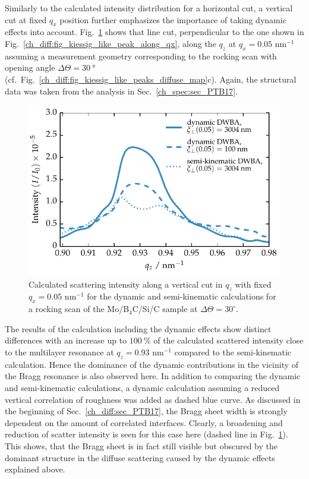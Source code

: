 Similarly to the calculated intensity distribution for a horizontal cut, a vertical cut at fixed $q_x$ position further emphasizes the importance of taking dynamic effects into account. Fig.~\ref{ch_diff:fig_comparison_full_semi} shows that line cut, perpendicular to the one shown in Fig.~\ref{ch_diff:fig_kiessig_like_peak_along_qx}, along the $q_z$ at $q_x=0.05$ nm$^{-1}$ assuming a measurement geometry corresponding to the rocking scan with opening angle $\Delta \Theta = \SI{30}{\degree}$ (cf.~Fig.~\ref{ch_diff:fig_kiessig_like_peaks_diffuse_map}c). Again, the structural data was taken from the analysis in Sec.~\ref{ch_spec:sec_PTB17}.
\begin{figure}[htbp]
        \includegraphics{img/PTB17_diffuse_qz_kinematic_vs_dynamic_100nm} \caption[Calculated diffuse scattering intensity along a vertical cut in $q_z$.]{Calculated scattering intensity along a vertical cut in $q_z$ with fixed $q_x=0.05$ nm$^{-1}$ for the dynamic and semi-kinematic calculations for a rocking scan of the Mo/B$_4$C/Si/C sample at $\Delta\Theta=30^\circ$.} \label{ch_diff:fig_comparison_full_semi} 
\end{figure}
The results of the calculation including the dynamic effects show distinct differences with an increase up to $\SI{100}{\percent}$ of the calculated scattered intensity close to the multilayer resonance at $q_z=0.93$ nm$^{-1}$ compared to the semi-kinematic calculation. Hence the dominance of the dynamic contributions in the vicinity of the Bragg resonance is also observed here. In addition to comparing the dynamic and semi-kinematic calculations, a dynamic calculation assuming a reduced vertical correlation of roughness was added as dashed blue curve. As discussed in the beginning of Sec.~\ref{ch_diff:sec_PTB17}, the Bragg sheet width is strongly dependent on the amount of correlated interfaces. Clearly, a broadening and reduction of scatter intensity is seen for this case here (dashed line in Fig.~\ref{ch_diff:fig_comparison_full_semi}). This shows, that the Bragg sheet is in fact still visible but obscured by the dominant structure in the diffuse scattering caused by the dynamic effects explained above.


